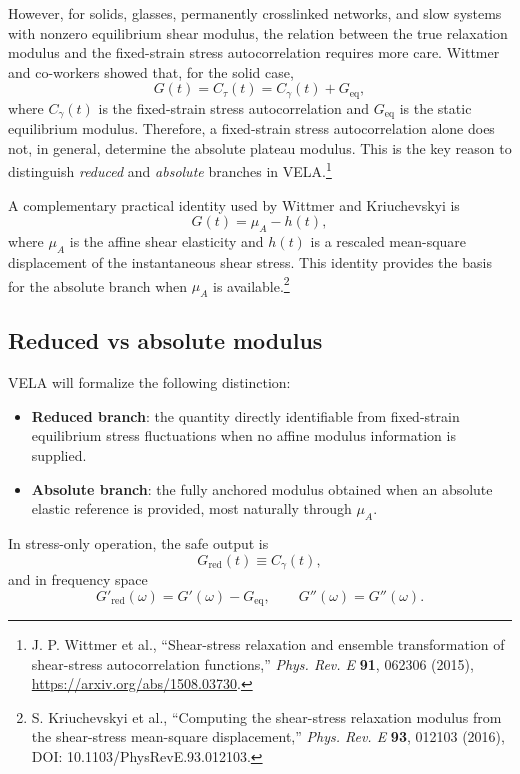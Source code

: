 \documentclass[11pt]{article}
\begin{document}
However, for solids, glasses, permanently crosslinked networks, and slow systems with nonzero equilibrium shear modulus, the relation between the true relaxation modulus and the fixed-strain stress autocorrelation requires more care. Wittmer and co-workers showed that, for the solid case,
\begin{equation}
G(t)=C_{\tau}(t)=C_{\gamma}(t)+G_{\mathrm{eq}},
\end{equation}
where $C_{\gamma}(t)$ is the fixed-strain stress autocorrelation and $G_{\mathrm{eq}}$ is the static equilibrium modulus. Therefore, a fixed-strain stress autocorrelation alone does not, in general, determine the absolute plateau modulus. This is the key reason to distinguish \emph{reduced} and \emph{absolute} branches in VELA.\footnote{J. P. Wittmer et al., ``Shear-stress relaxation and ensemble transformation of shear-stress autocorrelation functions,'' \emph{Phys. Rev. E} \textbf{91}, 062306 (2015), \url{https://arxiv.org/abs/1508.03730}.}

A complementary practical identity used by Wittmer and Kriuchevskyi is
\begin{equation}
G(t)=\mu_A-h(t),
\end{equation}
where $\mu_A$ is the affine shear elasticity and $h(t)$ is a rescaled mean-square displacement of the instantaneous shear stress. This identity provides the basis for the absolute branch when $\mu_A$ is available.\footnote{S. Kriuchevskyi et al., ``Computing the shear-stress relaxation modulus from the shear-stress mean-square displacement,'' \emph{Phys. Rev. E} \textbf{93}, 012103 (2016), DOI: 10.1103/PhysRevE.93.012103.}

\subsection{Reduced vs absolute modulus}

VELA will formalize the following distinction:
\begin{itemize}[leftmargin=2em]
  \item \textbf{Reduced branch}: the quantity directly identifiable from fixed-strain equilibrium stress fluctuations when no affine modulus information is supplied.
  \item \textbf{Absolute branch}: the fully anchored modulus obtained when an absolute elastic reference is provided, most naturally through $\mu_A$.
\end{itemize}

In stress-only operation, the safe output is
\begin{equation}
G_{\mathrm{red}}(t) \equiv C_{\gamma}(t),
\end{equation}
and in frequency space
\begin{equation}
G'_{\mathrm{red}}(\omega)=G'(\omega)-G_{\mathrm{eq}}, \qquad G''(\omega)=G''(\omega).
\end{equation}
\end{document}
